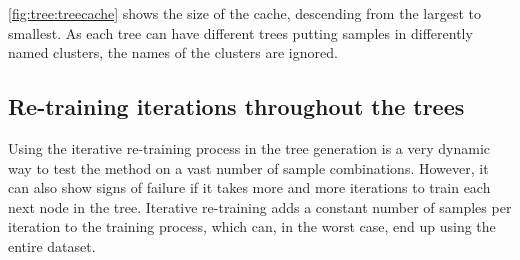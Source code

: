 \cref{fig:tree:treecache} shows the size of the cache, descending from the largest to smallest.
As each tree can have different trees putting samples in differently named clusters, the names of the clusters are ignored.

\subsection{Re-training iterations throughout the trees}
Using the iterative re-training process in the tree generation is a very dynamic way to test the method on a vast number of sample combinations.
However, it can also show signs of failure if it takes more and more iterations to train each next node in the tree.
Iterative re-training adds a constant number of samples per iteration to the training process, which can, in the worst case, end up using the entire dataset.

